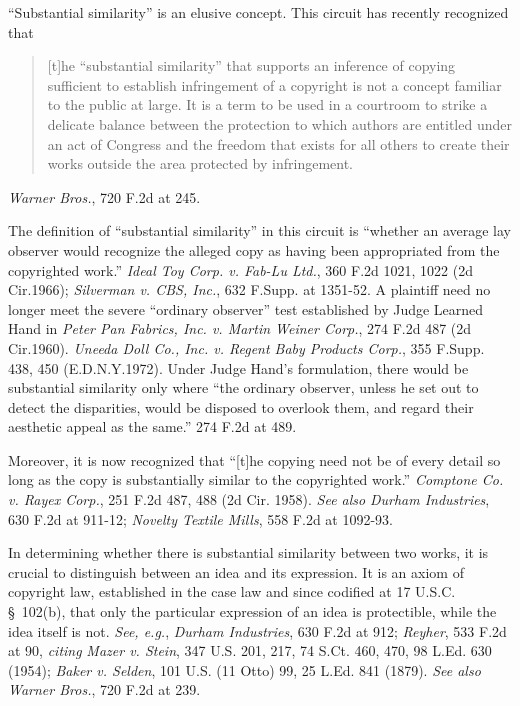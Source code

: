 ``Substantial similarity'' is an elusive concept. This circuit has recently
recognized that

\begin{quote} [t]he ``substantial similarity'' that supports an inference of
copying sufficient to establish infringement of a copyright is not a concept
familiar to the public at large. It is a term to be used in a courtroom to
strike a delicate balance between the protection to which authors are entitled
under an act of Congress and the freedom that exists for all others to create
their works outside the area protected by infringement. \end{quote}
\textit{Warner Bros.}, 720 F.2d at 245.

The definition of ``substantial similarity'' in this circuit is ``whether an
average lay observer would recognize the alleged copy as having been
appropriated from the copyrighted work.'' \textit{Ideal Toy Corp. v. Fab-Lu
Ltd.}, 360 F.2d 1021, 1022 (2d Cir.1966); \textit{Silverman v. CBS, Inc.}, 632
F.Supp. at 1351-52. A plaintiff need no longer meet the severe ``ordinary
observer'' test established by Judge Learned Hand in \textit{Peter Pan Fabrics,
Inc. v. Martin Weiner Corp.}, 274 F.2d 487 (2d Cir.1960). \textit{Uneeda Doll
Co., Inc. v. Regent Baby Products Corp.}, 355 F.Supp. 438, 450 (E.D.N.Y.1972).
Under Judge Hand's formulation, there would be substantial similarity only where
``the ordinary observer, unless he set out to detect the disparities, would be
disposed to overlook them, and regard their aesthetic appeal as the same.'' 274
F.2d at 489.

Moreover, it is now recognized that ``[t]he copying need not be of every detail
so long as the copy is substantially similar to the copyrighted work.''
\textit{Comptone Co. v. Rayex Corp.}, 251 F.2d 487, 488 (2d Cir. 1958).
\textit{See also} \textit{Durham Industries}, 630 F.2d at 911-12;
\textit{Novelty Textile Mills}, 558 F.2d at 1092-93.

In determining whether there is substantial similarity between two works, it is
crucial to distinguish between an idea and its expression. It is an axiom of
copyright law, established in the case law and since codified at 17 U.S.C.
\S~102(b), that only the  particular expression of an idea is protectible, while
the idea itself is not. \textit{See, e.g.}, \textit{Durham Industries}, 630 F.2d
at 912; \textit{Reyher}, 533 F.2d at 90, \textit{citing} \textit{Mazer v.
Stein}, 347 U.S. 201, 217, 74 S.Ct. 460, 470, 98 L.Ed. 630 (1954); \textit{Baker
v. Selden}, 101 U.S. (11 Otto) 99, 25 L.Ed. 841 (1879). \textit{See also}
\textit{Warner Bros.}, 720 F.2d at 239.

